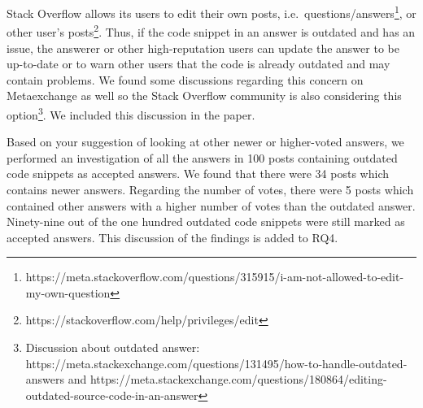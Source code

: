 \documentclass[a4paper,twoside,10pt]{reviewresponse}
\begin{document}

Stack Overflow allows its users to edit their own posts,
i.e.~questions/answers\footnote{https://meta.stackoverflow.com/questions/315915/i-am-not-allowed-to-edit-my-own-question}, or other user's posts\footnote{https://stackoverflow.com/help/privileges/edit}. Thus, if the code snippet in an answer is outdated and has an issue, the answerer or other high-reputation users can update the answer to be up-to-date or to warn other users that the code is already outdated and may contain problems. We found some discussions regarding this concern on Metaexchange as well so the Stack Overflow community is also considering this option\footnote{Discussion about outdated answer: https://meta.stackexchange.com/questions/131495/how-to-handle-outdated-answers and https://meta.stackexchange.com/questions/180864/editing-outdated-source-code-in-an-answer}. We included this discussion in the paper.

Based on your suggestion of looking at other newer or higher-voted answers, we
performed an investigation of all the answers in 100 posts containing outdated
code snippets as accepted answers. We found that there were 34 posts which
contains newer answers. Regarding the number of votes, there were 5 posts which
contained other answers with a higher number of votes than the outdated answer.
Ninety-nine out of the one hundred outdated code snippets were still marked as accepted
answers. This discussion of the findings is added to RQ4.
		
\end{document}
